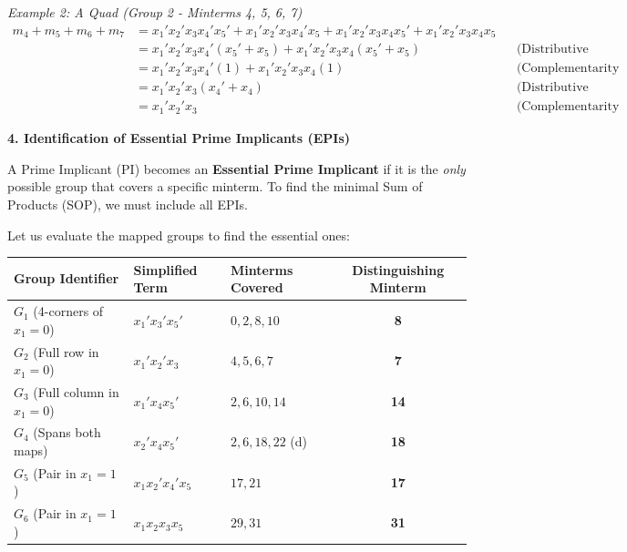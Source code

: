 \documentclass[12pt,a3paper]{article}
\begin{document}
\begin{enumerate}
\begin{tcolorbox}[enhanced,breakable,ansbox,colback=cC!4,colframe=cC,boxrule=0.8pt,arc=5pt,title={\textbf{Answer}},fonttitle=\bfseries\color{white},colbacktitle=cC]
\textit{Example 2: A Quad (Group 2 - Minterms 4, 5, 6, 7)}
\begin{align*}
    m_4 + m_5 + m_6 + m_7 &= x_1'x_2'x_3x_4'x_5' + x_1'x_2'x_3x_4'x_5 + x_1'x_2'x_3x_4x_5' + x_1'x_2'x_3x_4x_5 \\
    &= x_1'x_2'x_3x_4'(x_5' + x_5) + x_1'x_2'x_3x_4(x_5' + x_5) && \text{(Distributive Law)} \\
    &= x_1'x_2'x_3x_4'(1) + x_1'x_2'x_3x_4(1) && \text{(Complementarity Law)} \\
    &= x_1'x_2'x_3(x_4' + x_4) && \text{(Distributive \& Identity Laws)} \\
    &= x_1'x_2'x_3 && \text{(Complementarity \& Identity Laws)}
\end{align*}

\vspace{1em}
\textbf{4. Identification of Essential Prime Implicants (EPIs)}

A Prime Implicant (PI) becomes an \textbf{Essential Prime Implicant} if it is the \textit{only} possible group that covers a specific minterm. To find the minimal Sum of Products (SOP), we must include all EPIs.

Let us evaluate the mapped groups to find the essential ones:

\begin{center}
\renewcommand{\arraystretch}{1.3}
\begin{tabular}{@{}lllc@{}}
\toprule
\textbf{Group Identifier} & \textbf{Simplified Term} & \textbf{Minterms Covered} & \textbf{Distinguishing Minterm} \\
\midrule
$G_1$ (4-corners of $x_1=0$) & $x_1' x_3' x_5'$ & $0, 2, 8, 10$ & \textcolor{cC}{\textbf{8}} \\
$G_2$ (Full row in $x_1=0$) & $x_1' x_2' x_3$ & $4, 5, 6, 7$ & \textcolor{cC}{\textbf{7}} \\
$G_3$ (Full column in $x_1=0$) & $x_1' x_4 x_5'$ & $2, 6, 10, 14$ & \textcolor{cC}{\textbf{14}} \\
$G_4$ (Spans both maps) & $x_2' x_4 x_5'$ & $2, 6, 18, 22$ (d) & \textcolor{cC}{\textbf{18}} \\
$G_5$ (Pair in $x_1=1$) & $x_1 x_2' x_4' x_5$ & $17, 21$ & \textcolor{cC}{\textbf{17}} \\
$G_6$ (Pair in $x_1=1$) & $x_1 x_2 x_3 x_5$ & $29, 31$ & \textcolor{cC}{\textbf{31}} \\
\bottomrule
\end{tabular}
\end{center}


\end{tcolorbox}
\end{enumerate}
\end{document}
